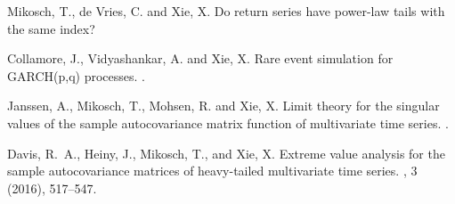 \begin{enumerate}



{\sc Mikosch, T., de Vries, C. and Xie, X.}
\newblock Do return series have power-law tails with the same index?

{\sc Collamore, J., Vidyashankar, A. and Xie, X.}
\newblock Rare event simulation for GARCH(p,q) processes.
.

{\sc Janssen, A., Mikosch, T., Mohsen, R. and Xie, X.}
\newblock Limit theory for the singular values of the sample autocovariance
  matrix function of multivariate time series.
.

{\sc Davis, R.~A., Heiny, J., Mikosch, T., and Xie, X.}
\newblock Extreme value analysis for the sample autocovariance matrices of
  heavy-tailed multivariate time series.
, 3 (2016), 517--547. \href{http://link.springer.com/article/10.1007/s10687-016-0251-7}{\blue{[pdf]}}
\end{enumerate}


\newpage
\tableofcontents

\mainmatter

\def\phdthesis{1}






% 


\newpage
\leavevmode\thispagestyle{empty}
\phantom{bla}










